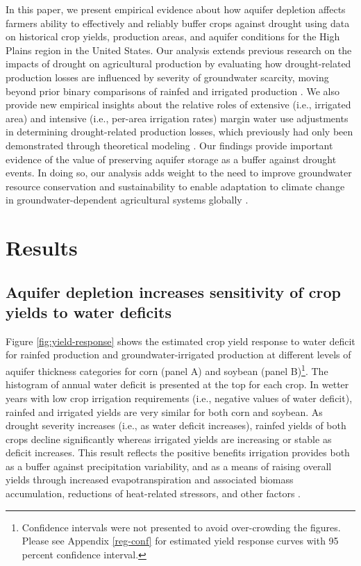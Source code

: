 \documentclass[
]{article}
\begin{document}
In this paper, we present empirical evidence about how aquifer depletion affects farmers ability to effectively and reliably buffer crops against drought using data on historical crop yields, production areas, and aquifer conditions for the High Plains region in the United States. Our analysis extends previous research on the impacts of drought on agricultural production by evaluating how drought-related production losses are influenced by severity of groundwater scarcity, moving beyond prior binary comparisons of rainfed and irrigated production \citep{schlenker2009nonlinear, lobell2014greater, lu2018crop}. We also provide new empirical insights about the relative roles of extensive (i.e., irrigated area) and intensive (i.e., per-area irrigation rates) margin water use adjustments in determining drought-related production losses, which previously had only been demonstrated through theoretical modeling \citep{foster2014modeling, foster2017effects, rad2020effects}. Our findings provide important evidence of the value of preserving aquifer storage as a buffer against drought events. In doing so, our analysis adds weight to the need to improve groundwater resource conservation and sustainability to enable adaptation to climate change in groundwater-dependent agricultural systems globally \citep{jain2021groundwater, scanlon2023global}.

\hypertarget{results}{%
\section{Results}\label{results}}

\hypertarget{impact-intensive}{%
\subsection{Aquifer depletion increases sensitivity of crop yields to water deficits}\label{impact-intensive}}

Figure \ref{fig:yield-response} shows the estimated crop yield response to water deficit for rainfed production and groundwater-irrigated production at different levels of aquifer thickness categories for corn (panel A) and soybean (panel B)\footnote{Confidence intervals were not presented to avoid over-crowding the figures. Please see Appendix \ref{reg-conf} for estimated yield response curves with 95 percent confidence interval.}. The histogram of annual water deficit is presented at the top for each crop. In wetter years with low crop irrigation requirements (i.e., negative values of water deficit), rainfed and irrigated yields are very similar for both corn and soybean. As drought severity increases (i.e., as water deficit increases), rainfed yields of both crops decline significantly whereas irrigated yields are increasing or stable as deficit increases. This result reflects the positive benefits irrigation provides both as a buffer against precipitation variability, and as a means of raising overall yields through increased evapotranspiration and associated biomass accumulation, reductions of heat-related stressors, and other factors \citep{zhu2022untangling, li2020quantifying}.
\end{document}
